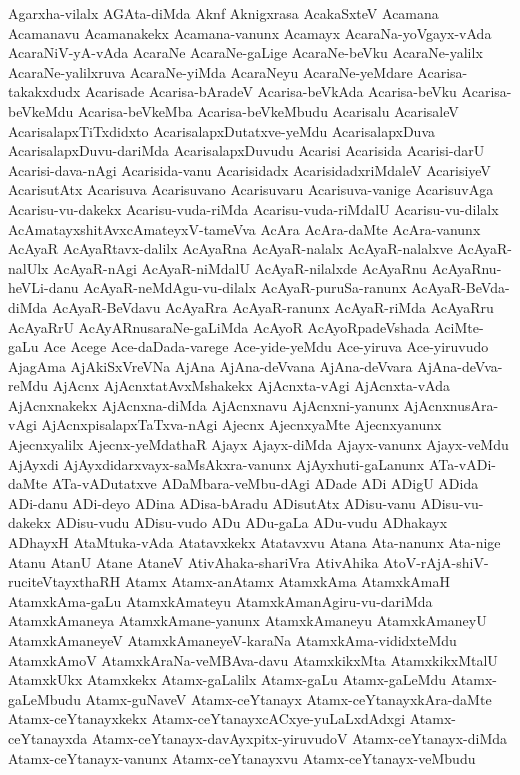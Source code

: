 {Agarxha-vilalx
AGAta-diMda
Aknf
Aknigxrasa
AcakaSxteV
Acamana
Acamanavu
Acamanakekx
Acamana-vanunx
Acamayx
AcaraNa-yoVgayx-vAda
AcaraNiV-yA-vAda
AcaraNe
AcaraNe-gaLige
AcaraNe-beVku
AcaraNe-yalilx
AcaraNe-yalilxruva
AcaraNe-yiMda
AcaraNeyu
AcaraNe-yeMdare
Acarisa-takakxdudx
Acarisade
Acarisa-bAradeV
Acarisa-beVkAda
Acarisa-beVku
Acarisa-beVkeMdu
Acarisa-beVkeMba
Acarisa-beVkeMbudu
Acarisalu
AcarisaleV
AcarisalapxTiTxdidxto
AcarisalapxDutatxve-yeMdu
AcarisalapxDuva
AcarisalapxDuvu-dariMda
AcarisalapxDuvudu
Acarisi
Acarisida
Acarisi-darU
Acarisi-dava-nAgi
Acarisida-vanu
Acarisidadx
AcarisidadxriMdaleV
AcarisiyeV
AcarisutAtx
Acarisuva
Acarisuvano
Acarisuvaru
Acarisuva-vanige
AcarisuvAga
Acarisu-vu-dakekx
Acarisu-vuda-riMda
Acarisu-vuda-riMdalU
Acarisu-vu-dilalx
AcAmatayxshitAvxcAmateyxV-tameVva
AcAra
AcAra-daMte
AcAra-vanunx
AcAyaR
AcAyaRtavx-dalilx
AcAyaRna
AcAyaR-nalalx
AcAyaR-nalalxve
AcAyaR-nalUlx
AcAyaR-nAgi
AcAyaR-niMdalU
AcAyaR-nilalxde
AcAyaRnu
AcAyaRnu-heVLi-danu
AcAyaR-neMdAgu-vu-dilalx
AcAyaR-puruSa-ranunx
AcAyaR-BeVda-diMda
AcAyaR-BeVdavu
AcAyaRra
AcAyaR-ranunx
AcAyaR-riMda
AcAyaRru
AcAyaRrU
AcAyARnusaraNe-gaLiMda
AcAyoR
AcAyoRpadeVshada
AciMte-gaLu
Ace
Acege
Ace-daDada-varege
Ace-yide-yeMdu
Ace-yiruva
Ace-yiruvudo
AjagAma
AjAkiSxVreVNa
AjAna
AjAna-deVvana
AjAna-deVvara
AjAna-deVva-reMdu
AjAcnx
AjAcnxtatAvxMshakekx
AjAcnxta-vAgi
AjAcnxta-vAda
AjAcnxnakekx
AjAcnxna-diMda
AjAcnxnavu
AjAcnxni-yanunx
AjAcnxnusAra-vAgi
AjAcnxpisalapxTaTxva-nAgi
Ajecnx
AjecnxyaMte
Ajecnxyanunx
Ajecnxyalilx
Ajecnx-yeMdathaR
Ajayx
Ajayx-diMda
Ajayx-vanunx
Ajayx-veMdu
AjAyxdi
AjAyxdidarxvayx-saMsAkxra-vanunx
AjAyxhuti-gaLanunx
ATa-vADi-daMte
ATa-vADutatxve
ADaMbara-veMbu-dAgi
ADade
ADi
ADigU
ADida
ADi-danu
ADi-deyo
ADina
ADisa-bAradu
ADisutAtx
ADisu-vanu
ADisu-vu-dakekx
ADisu-vudu
ADisu-vudo
ADu
ADu-gaLa
ADu-vudu
ADhakayx
ADhayxH
AtaMtuka-vAda
Atatavxkekx
Atatavxvu
Atana
Ata-nanunx
Ata-nige
Atanu
AtanU
Atane
AtaneV
AtivAhaka-shariVra
AtivAhika
AtoV-rAjA-shiV-ruciteVtayxthaRH
Atamx
Atamx-anAtamx
AtamxkAma
AtamxkAmaH
AtamxkAma-gaLu
AtamxkAmateyu
AtamxkAmanAgiru-vu-dariMda
AtamxkAmaneya
AtamxkAmane-yanunx
AtamxkAmaneyu
AtamxkAmaneyU
AtamxkAmaneyeV
AtamxkAmaneyeV-karaNa
AtamxkAma-vididxteMdu
AtamxkAmoV
AtamxkAraNa-veMBAva-davu
AtamxkikxMta
AtamxkikxMtalU
AtamxkUkx
Atamxkekx
Atamx-gaLalilx
Atamx-gaLu
Atamx-gaLeMdu
Atamx-gaLeMbudu
Atamx-guNaveV
Atamx-ceYtanayx
Atamx-ceYtanayxkAra-daMte
Atamx-ceYtanayxkekx
Atamx-ceYtanayxcACxye-yuLaLxdAdxgi
Atamx-ceYtanayxda
Atamx-ceYtanayx-davAyxpitx-yiruvudoV
Atamx-ceYtanayx-diMda
Atamx-ceYtanayx-vanunx
Atamx-ceYtanayxvu
Atamx-ceYtanayx-veMbudu
}
